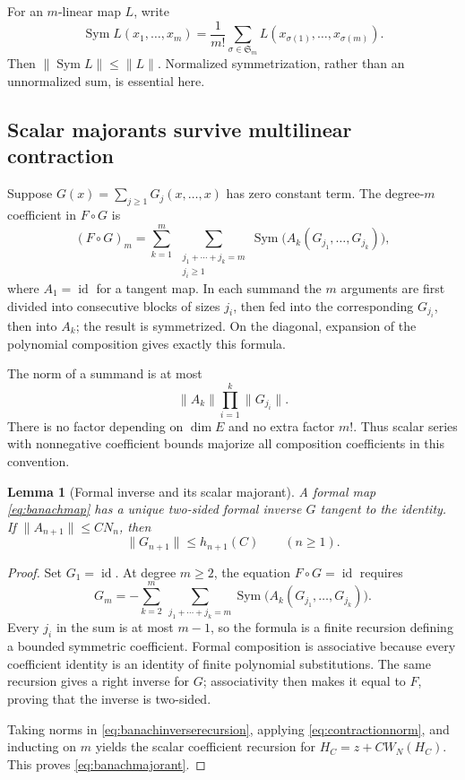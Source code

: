 \documentclass[11pt,a4paper]{article}
\numberwithin{equation}{section}
\newtheorem{lemma}[theorem]{Lemma}
\theoremstyle{definition}
\theoremstyle{remark}
\newcommand{\id}{\operatorname{id}}
\newcommand{\Sym}{\operatorname{Sym}}
\begin{document}
For an $m$-linear map $L$, write
\[
 \Sym L(x_1,\ldots,x_m)=\frac1{m!}
 \sum_{\sigma\in\mathfrak S_m}L(x_{\sigma(1)},\ldots,x_{\sigma(m)}).
\]
Then $\|\Sym L\|\le\|L\|$. Normalized symmetrization, rather than an
unnormalized sum, is essential here.

\subsection{Scalar majorants survive multilinear contraction}

Suppose $G(x)=\sum_{j\ge1}G_j(x,\ldots,x)$ has zero constant term.
The degree-$m$ coefficient in $F\circ G$ is
\begin{equation}
 (F\circ G)_m=
 \sum_{k=1}^m\ \sum_{\substack{j_1+\cdots+j_k=m\\j_i\ge1}}
 \Sym\bigl(A_k(G_{j_1},\ldots,G_{j_k})\bigr),
 \label{eq:banachcomposition}
\end{equation}
where $A_1=\id$ for a tangent map. In each summand the $m$ arguments
are first divided into consecutive blocks of sizes $j_i$, then fed into
the corresponding $G_{j_i}$, then into $A_k$; the result is symmetrized.
On the diagonal, expansion of the polynomial composition gives exactly
this formula.

The norm of a summand is at most
\begin{equation}
 \|A_k\|\prod_{i=1}^k\|G_{j_i}\|.
 \label{eq:contractionnorm}
\end{equation}
There is no factor depending on $\dim E$ and no extra factor $m!$.
Thus scalar series with nonnegative coefficient bounds majorize all
composition coefficients in this convention.

\begin{lemma}[Formal inverse and its scalar majorant]
\label{lem:banachinverse}
A formal map \eqref{eq:banachmap} has a unique two-sided formal inverse
$G$ tangent to the identity. If $\|A_{n+1}\|\le CN_n$, then
\begin{equation}
 \|G_{n+1}\|\le h_{n+1}(C)\qquad(n\ge1).
 \label{eq:banachmajorant}
\end{equation}
\end{lemma}
\begin{proof}
Set $G_1=\id$. At degree $m\ge2$, the equation $F\circ G=\id$
requires
\begin{equation}
 G_m=-\sum_{k=2}^m\ \sum_{j_1+\cdots+j_k=m}
          \Sym\bigl(A_k(G_{j_1},\ldots,G_{j_k})\bigr).
 \label{eq:banachinverserecursion}
\end{equation}
Every $j_i$ in the sum is at most $m-1$, so the formula is a finite
recursion defining a bounded symmetric coefficient. Formal composition
is associative because every coefficient identity is an identity of
finite polynomial substitutions. The same recursion gives a right
inverse for $G$; associativity then makes it equal to $F$, proving that
the inverse is two-sided.

Taking norms in \eqref{eq:banachinverserecursion}, applying
\eqref{eq:contractionnorm}, and inducting on $m$ yields the scalar
coefficient recursion for $H_C=z+CW_N(H_C)$. This proves
\eqref{eq:banachmajorant}.
\end{proof}
\end{document}
